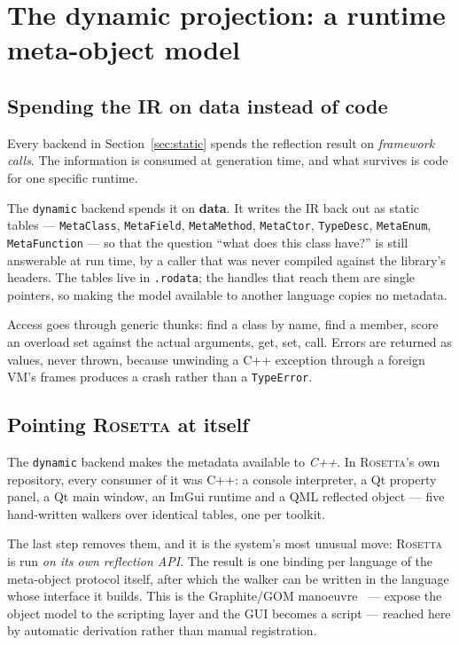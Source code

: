 \documentclass[11pt,a4paper]{article}
\newcommand{\rosetta}{\textsc{Rosetta}}
\newcommand{\code}[1]{\texttt{\small #1}}
\begin{document}
\section{The dynamic projection: a runtime meta-object model}
\label{sec:dynamic}

\subsection{Spending the IR on data instead of code}

Every backend in Section~\ref{sec:static} spends the reflection result on
\emph{framework calls}. The information is consumed at generation time, and what
survives is code for one specific runtime.

The \code{dynamic} backend spends it on \textbf{data}. It writes the IR back out
as static tables --- \code{MetaClass}, \code{MetaField}, \code{MetaMethod},
\code{MetaCtor}, \code{TypeDesc}, \code{MetaEnum}, \code{MetaFunction} --- so
that the question ``what does this class have?'' is still answerable at run
time, by a caller that was never compiled against the library's headers. The
tables live in \code{.rodata}; the handles that reach them are single
pointers, so making the model available to another language copies no metadata.

Access goes through generic thunks: find a class by name, find a member, score
an overload set against the actual arguments, get, set, call. Errors are
returned as values, never thrown, because unwinding a C++ exception through a
foreign VM's frames produces a crash rather than a \code{TypeError}.

\subsection{Pointing \rosetta{} at itself}

The \code{dynamic} backend makes the metadata available to \emph{C++}. In
\rosetta's own repository, every consumer of it was C++: a console interpreter,
a Qt property panel, a Qt main window, an ImGui runtime and a QML reflected
object --- five hand-written walkers over identical tables, one per toolkit.

The last step removes them, and it is the system's most unusual move: \rosetta{}
is run \emph{on its own reflection API}. The result is one binding per language
of the meta-object protocol itself, after which the walker can be written in the
language whose interface it builds. This is the Graphite/GOM
manoeuvre~\cite{graphite} --- expose the object model to the scripting layer and
the GUI becomes a script --- reached here by automatic derivation rather than
manual registration.
\end{document}

